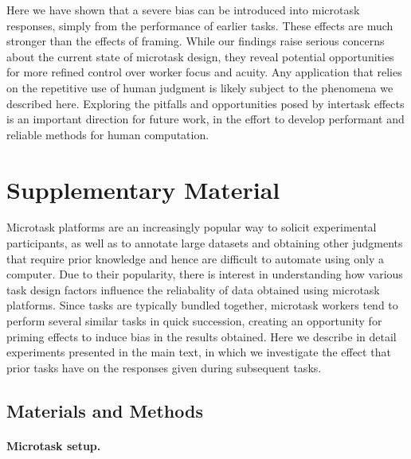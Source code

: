 \documentclass[12pt]{article}
\begin{document}
Here we have shown that a severe bias can be introduced into microtask 
responses, simply from the performance of earlier tasks. 
These effects are much stronger than the effects of framing.  
While our findings raise serious concerns about the 
current state of microtask design, they reveal potential opportunities 
for more 
refined control over worker focus and acuity.  Any application that relies
on the repetitive use of human judgment is likely subject to the phenomena
we described here.  Exploring the pitfalls and opportunities posed by
intertask effects is an important direction for future work, 
in the effort to develop performant and reliable methods for human 
computation.




\pagebreak
\section*{Supplementary Material}
\renewcommand{\figurename}{Figure S\!\!}
\renewcommand{\tablename}{Table S\!\!}
\renewcommand{\theequation}{S\arabic{equation}}
\setcounter{figure}{0}
\setcounter{table}{0}
\setcounter{equation}{0}

Microtask platforms are an increasingly popular way to solicit experimental
participants, as well as to annotate large datasets and obtaining other 
judgments that require prior knowledge and 
hence are difficult to automate using only a computer.  Due to their 
popularity, there is interest in understanding how various task design factors
influence the reliabality of data obtained using microtask platforms.  
Since tasks are typically bundled together, microtask 
workers tend to perform several similar tasks in quick succession, creating an opportunity for priming effects to induce bias in the results obtained.
Here we describe in detail experiments presented in the main text, in which
we investigate the effect that prior tasks have on the responses given during
subsequent tasks.  

\subsection*{Materials and Methods}

\paragraph{Microtask setup.}
\end{document}

